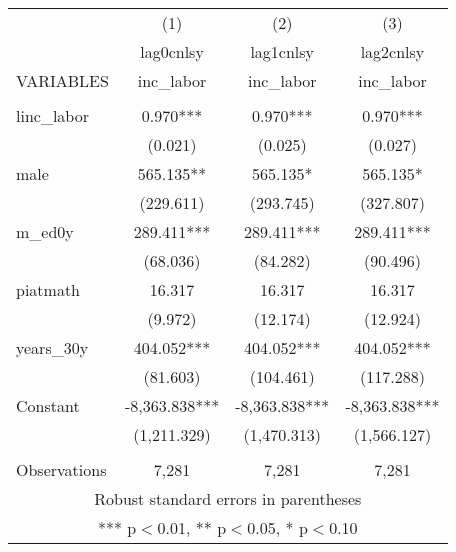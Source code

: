 \begin{tabular}{lccc} \hline
 & (1) & (2) & (3) \\
 & lag0cnlsy & lag1cnlsy & lag2cnlsy \\
VARIABLES & inc\_labor & inc\_labor & inc\_labor \\ \hline
 &  &  &  \\
linc\_labor & 0.970*** & 0.970*** & 0.970*** \\
 & (0.021) & (0.025) & (0.027) \\
male & 565.135** & 565.135* & 565.135* \\
 & (229.611) & (293.745) & (327.807) \\
m\_ed0y & 289.411*** & 289.411*** & 289.411*** \\
 & (68.036) & (84.282) & (90.496) \\
piatmath & 16.317 & 16.317 & 16.317 \\
 & (9.972) & (12.174) & (12.924) \\
years\_30y & 404.052*** & 404.052*** & 404.052*** \\
 & (81.603) & (104.461) & (117.288) \\
Constant & -8,363.838*** & -8,363.838*** & -8,363.838*** \\
 & (1,211.329) & (1,470.313) & (1,566.127) \\
 &  &  &  \\
 Observations & 7,281 & 7,281 & 7,281 \\ \hline
\multicolumn{4}{c}{ Robust standard errors in parentheses} \\
\multicolumn{4}{c}{ *** p$<$0.01, ** p$<$0.05, * p$<$0.10} \\
\end{tabular}

